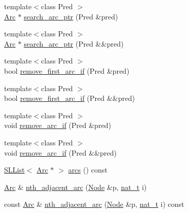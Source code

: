 \begin{DoxyCompactItemize}
{\footnotesize template$<$class Pred $>$ }\\\hyperlink{namespace_designar_a3f55fb5513d62ff47cbc8f72b8e95d6f}{Arc} $\ast$ \hyperlink{class_designar_1_1_base_graph_afcbc602350567bc5a377fd7fc94419ae}{search\+\_\+arc\+\_\+ptr} (Pred \&pred)
\item 
{\footnotesize template$<$class Pred $>$ }\\\hyperlink{namespace_designar_a3f55fb5513d62ff47cbc8f72b8e95d6f}{Arc} $\ast$ \hyperlink{class_designar_1_1_base_graph_a4ffe61f2548a892d070aa46609c4532c}{search\+\_\+arc\+\_\+ptr} (Pred \&\&pred)
\item 
{\footnotesize template$<$class Pred $>$ }\\bool \hyperlink{class_designar_1_1_base_graph_ae45255ef62c056e76c5e5c45182e9490}{remove\+\_\+first\+\_\+arc\+\_\+if} (Pred \&pred)
\item 
{\footnotesize template$<$class Pred $>$ }\\bool \hyperlink{class_designar_1_1_base_graph_a990426c9e87f922bbbd0c9bc4d2cedd8}{remove\+\_\+first\+\_\+arc\+\_\+if} (Pred \&\&pred)
\item 
{\footnotesize template$<$class Pred $>$ }\\void \hyperlink{class_designar_1_1_base_graph_a9c97f2759a2847e61e17dc2806172758}{remove\+\_\+arc\+\_\+if} (Pred \&pred)
\item 
{\footnotesize template$<$class Pred $>$ }\\void \hyperlink{class_designar_1_1_base_graph_a0e516bee6e0247de6bdd207de57caad6}{remove\+\_\+arc\+\_\+if} (Pred \&\&pred)
\item 
\hyperlink{class_designar_1_1_s_l_list}{S\+L\+List}$<$ \hyperlink{namespace_designar_a3f55fb5513d62ff47cbc8f72b8e95d6f}{Arc} $\ast$ $>$ \hyperlink{class_designar_1_1_base_graph_af9d306a0474e8e3b38b7bd697b844d11}{arcs} () const
\item 
\hyperlink{namespace_designar_a3f55fb5513d62ff47cbc8f72b8e95d6f}{Arc} \& \hyperlink{class_designar_1_1_base_graph_aa0047160fb8424fe88dc7c1785f66827}{nth\+\_\+adjacent\+\_\+arc} (\hyperlink{namespace_designar_a5af326c65aa2bd26b26c410f2030d09e}{Node} \&p, \hyperlink{namespace_designar_aa72662848b9f4815e7bf31a7cf3e33d1}{nat\+\_\+t} i)
\item 
const \hyperlink{namespace_designar_a3f55fb5513d62ff47cbc8f72b8e95d6f}{Arc} \& \hyperlink{class_designar_1_1_base_graph_a3ca561f708fec1724d5c95192f98ef96}{nth\+\_\+adjacent\+\_\+arc} (\hyperlink{namespace_designar_a5af326c65aa2bd26b26c410f2030d09e}{Node} \&p, \hyperlink{namespace_designar_aa72662848b9f4815e7bf31a7cf3e33d1}{nat\+\_\+t} i) const

\end{DoxyCompactItemize}
